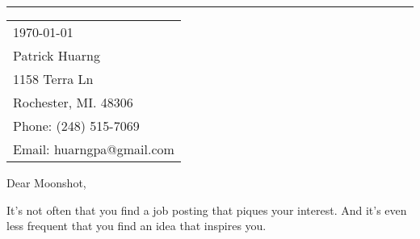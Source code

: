 \documentclass{article}
\begin{document}


\vspace{-1em} %

\rule{\linewidth}{1pt} %

\bigskip\bigskip %


\hfill
\begin{tabular}{l @{}}
	\today \bigskip\\ %
	Patrick Huarng \\
	1158 Terra Ln \\ %
	Rochester, MI. 48306 \\
	Phone: (248) 515-7069 \\
	Email: huarngpa@gmail.com
\end{tabular}

\bigskip %



\bigskip %

Dear Moonshot,

\bigskip %


It's not often that you find a job posting that piques your interest. And it's even less frequent that you find an idea that inspires you.
\end{document}
